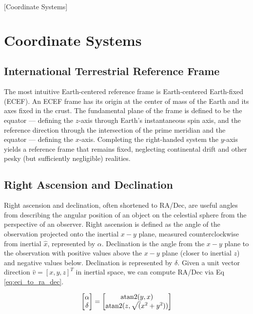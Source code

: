 [Coordinate Systems]

\section{Coordinate Systems}

\subsection{International Terrestrial Reference Frame}

The most intuitive Earth-centered reference frame is Earth-centered Earth-fixed (ECEF). An ECEF
frame has its origin at the center of mass of the Earth and its axes fixed in the crust. The
fundamental plane of the frame is defined to be the equator ---  defining the $z$-axis through Earth's
instantaneous spin axis, and the reference direction through the intersection of the prime meridian
and the equator ---  defining the $x$-axis. Completing the right-handed system the $y$-axis yields a
reference frame that remains fixed, neglecting continental drift and other pesky (but sufficiently
negligible) realities. 

\subsection{Right Ascension and Declination}

Right ascension and declination, often shortened to RA/Dec, are useful angles from describing the angular position of an object
on the celestial sphere from the perspective of an observer. Right ascension is defined as the angle
of the observation projected onto the inertial $x-y$ plane, measured counterclockwise from inertial
$\hat{x}$, represented by $\alpha$. Declination is the angle from the $x-y$ plane to the observation
with positive values above the $x-y$ plane (closer to inertial $z$) and negative values below.
Declination is represented by $\delta$. Given a unit vector direction $\hat{v} = \left[ x, y, z \right]^T$ in
inertial space, we can compute RA/Dec via Eq \ref{eq:eci_to_ra_dec}.

\begin{equation} \label{eq:eci_to_ra_dec}
  \begin{bmatrix}
	\alpha \\
	\delta
  \end{bmatrix} = 
  \begin{bmatrix}
	\operatorname{atan2}(y, x) \\
	\operatorname{atan2}(z, \sqrt(x^2 + y^2))
  \end{bmatrix}
\end{equation}

